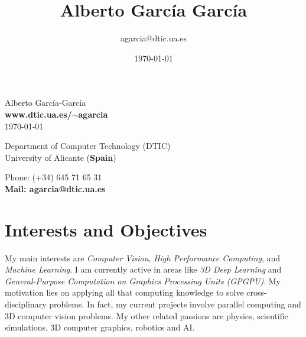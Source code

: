 \documentclass[8pt]{article}
\title{\bfseries\Huge Alberto García García}
\author{agarcia@dtic.ua.es}
\date{\today}
\begin{document}
\begin{center}
	\Huge Alberto García-García\\
	\Large \textbf{www.dtic.ua.es/$\sim$agarcia}\\
	\today
\end{center}
\bigskip
\begin{minipage}[ht]{0.65\textwidth}
Department of Computer Technology (DTIC)\\
University of Alicante (\textbf{Spain})\\
\end{minipage}
\hfill
\begin{minipage}[ht]{0.3\textwidth}
Phone: (+34) 645 71 65 31\\
\textbf{Mail: agarcia@dtic.ua.es}\\
\end{minipage}
 
\section*{Interests and Objectives}

My main interests are \emph{Computer Vision}, \emph{High Performance Computing}, and \emph{Machine Learning}. I am currently active in areas like \emph{3D Deep Learning} and \emph{General-Purpose Computation on Graphics Processing Units (GPGPU)}. My motivation lies on applying all that computing knowledge to solve cross-disciplinary problems. In fact, my current projects involve parallel computing and 3D computer vision problems. My other related passions are physics, scientific simulations, 3D computer graphics, robotics and AI.
 
\end{document}
